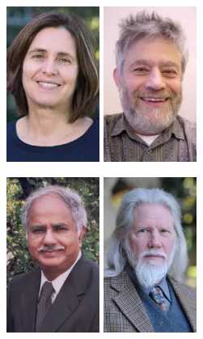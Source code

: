 \documentclass[xcolor={usenames,dvipsnames,svgnames,table},12pt]{beamer}
\begin{document}
\begin{frame}{}
  \begin{center}
    \includegraphics[height=2in]{shafi-goldwasser.jpg} \quad
    \includegraphics[height=2in]{manuel-blum.jpg}
  \end{center}
\end{frame}

\begin{frame}{}
  \begin{center}
    \includegraphics[height=2in]{dabbala-reddy.jpg} \quad
    \includegraphics[height=2in]{whitfield-diffie.jpg}
  \end{center}
\end{frame}
\end{document}
